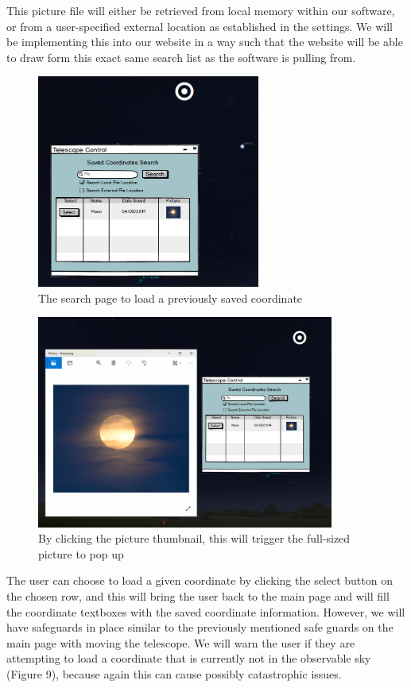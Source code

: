 \documentclass[12pt]{report}
\begin{document}
This picture file will either be retrieved from local memory within our software, or from a user-specified external location as established in the settings. We will be implementing this into our website in a way such that the website will be able to draw form this exact same search list as the software is pulling from.

\begin{figure}[h]
	\centering
	\includegraphics[width=0.55\linewidth, height=7.0cm]{SearchPage}
	\caption{The search page to load a previously saved coordinate}
\end{figure}

\newpage

\begin{figure}[h]
	\centering
	\includegraphics[width=0.65\linewidth, height=7.0cm]{SearchClickedPicture}
	\caption{By clicking the picture thumbnail, this will trigger the full-sized picture to pop up}
\end{figure}

The user can choose to load a given coordinate by clicking the select button on the chosen row, and this will bring the user back to the main page and will fill the coordinate textboxes with the saved coordinate information. However, we will have safeguards in place similar to the previously mentioned safe guards on the main page with moving the telescope. We will warn the user if they are attempting to load a coordinate that is currently not in the observable sky (Figure 9), because again this can cause possibly catastrophic issues.
\end{document}
